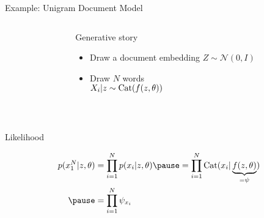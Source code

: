 \documentclass[14pt]{beamer}
\begin{document}
\begin{frame}{Example: Unigram Document Model}


\begin{columns}
	\begin{column}{0.2\textwidth}
    \end{column}
    \begin{column}{0.75\textwidth}
    	Generative story 
    	\begin{itemize}
			\item Draw a document embedding $Z \sim \mathcal N(0, I)$
			\item Draw $N$ words\\
			$X_i|z \sim \operatorname{Cat}(f(z, \theta))$
		\end{itemize}
    \end{column}
    \end{columns}
    
    
    ~
    
	Likelihood \pause
	\begin{small}
    \begin{equation*}
	\begin{aligned}						
		p(x_1^N|z, \theta) &= \prod_{i=1}^N p(x_i|z, \theta) \pause = \prod_{i=1}^N \Cat(x_i|\underbrace{f(z, \theta)}_{=\psi}) \\ \pause
		&= \prod_{i=1}^N \psi_{x_i}
	\end{aligned}
	\end{equation*}
	\end{small}

\end{frame}
\end{document}
